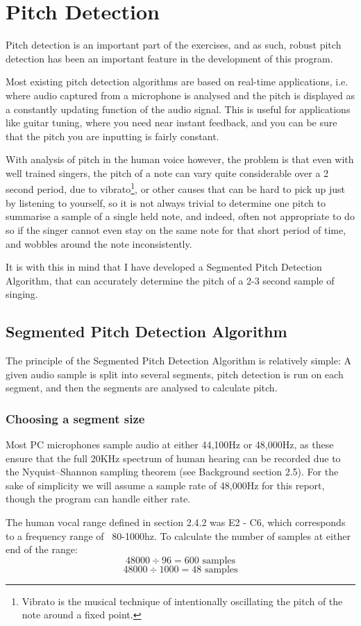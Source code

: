 \section{Pitch Detection}
\par Pitch detection is an important part of the exercises, and as such, robust pitch detection has been an important feature in the development of this program. 
\par Most existing pitch detection algorithms are based on real-time applications, i.e. where audio captured from a microphone is analysed and the pitch is displayed as a constantly updating function of the audio signal. This is useful for applications like guitar tuning, where you need near instant feedback, and you can be sure that the pitch you are inputting is fairly constant. 
\par With analysis of pitch in the human voice however, the problem is that even with well trained singers, the pitch of a note can vary quite considerable over a 2 second period, due to vibrato\footnote{Vibrato is the musical technique of intentionally oscillating the pitch of the note around a fixed point.}, or other causes that can be hard to pick up just by listening to yourself, so it is not always trivial to determine one pitch to summarise a sample of a single held note, and indeed, often not appropriate to do so if the singer cannot even stay on the same note for that short period of time, and wobbles around the note inconsistently.
\par It is with this in mind that I have developed a Segmented Pitch Detection Algorithm, that can accurately determine the pitch of a 2-3 second sample of singing.

\subsection{Segmented Pitch Detection Algorithm}
The principle of the Segmented Pitch Detection Algorithm is relatively simple: A given audio sample is split into several segments, pitch detection is run on each segment, and then the segments are analysed to calculate pitch.





\subsubsection{Choosing a segment size}
\par Most PC microphones sample audio at either 44,100Hz or 48,000Hz, as these ensure that the full 20KHz spectrum of human hearing can be recorded due to the Nyquist–Shannon sampling theorem (see Background section 2.5). For the sake of simplicity we will assume a sample rate of 48,000Hz for this report, though the program can handle either rate.
\par The human vocal range defined in section 2.4.2 was E2 - C6, which corresponds to a frequency range of ~80-1000hz\cite{scientificPitchTable}. To calculate the number of samples at either end of the range: 
 		 \[48000\div 96 = 600 \text{ samples}\] 
		 \[48000\div 1000 = 48 \text{ samples}\]
		
